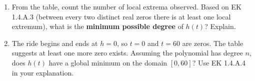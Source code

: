 \documentclass[10pt]{article}
\begin{document}
\vspace{0.10in}

\begin{tcolorbox}[colback=white, colframe=black!40,
    title=\textbf{Tier E --- Extend: Degree and Global Extrema},
    fonttitle=\bfseries, arc=2mm, left=3mm, right=3mm, top=2mm, bottom=2mm]

\begin{enumerate}[leftmargin=1.5em, itemsep=8pt]
    \item From the table, count the number of local extrema observed. Based on EK 1.4.A.3
    (between every two distinct real zeros there is at least one local extremum), what is the
    \textbf{minimum possible degree} of $h(t)$? Explain.

    \vspace{4pt}
    \blank{11cm}

    \vspace{2pt}
    \blank{11cm}

    \item The ride begins and ends at $h = 0$, so $t = 0$ and $t = 60$ are zeros. The table
    suggests at least one more zero exists. Assuming the polynomial has degree $n$, does
    $h(t)$ have a global minimum on the domain $[0, 60]$? Use EK 1.4.A.4 in your explanation.

    \vspace{4pt}
    \blank{11cm}

    \vspace{2pt}
    \blank{11cm}
\end{enumerate}
\end{tcolorbox}
\end{document}

